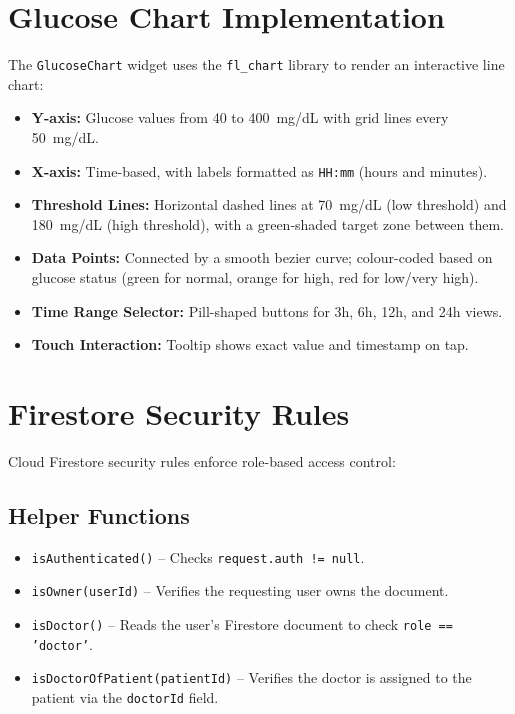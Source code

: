 \documentclass[12pt,a4paper]{article}
\begin{document}
\section{Glucose Chart Implementation}

The \texttt{GlucoseChart} widget uses the \texttt{fl\_chart} library to render an interactive line chart:

\begin{itemize}
    \item \textbf{Y-axis:} Glucose values from 40 to 400~mg/dL with grid lines every 50~mg/dL.
    \item \textbf{X-axis:} Time-based, with labels formatted as \texttt{HH:mm} (hours and minutes).
    \item \textbf{Threshold Lines:} Horizontal dashed lines at 70~mg/dL (low threshold) and 180~mg/dL (high threshold), with a green-shaded target zone between them.
    \item \textbf{Data Points:} Connected by a smooth bezier curve; colour-coded based on glucose status (green for normal, orange for high, red for low/very high).
    \item \textbf{Time Range Selector:} Pill-shaped buttons for 3h, 6h, 12h, and 24h views.
    \item \textbf{Touch Interaction:} Tooltip shows exact value and timestamp on tap.
\end{itemize}

\section{Firestore Security Rules}

Cloud Firestore security rules enforce role-based access control:

\subsection{Helper Functions}
\begin{itemize}
    \item \texttt{isAuthenticated()} -- Checks \texttt{request.auth != null}.
    \item \texttt{isOwner(userId)} -- Verifies the requesting user owns the document.
    \item \texttt{isDoctor()} -- Reads the user's Firestore document to check \texttt{role == 'doctor'}.
    \item \texttt{isDoctorOfPatient(patientId)} -- Verifies the doctor is assigned to the patient via the \texttt{doctorId} field.
\end{itemize}
\end{document}
